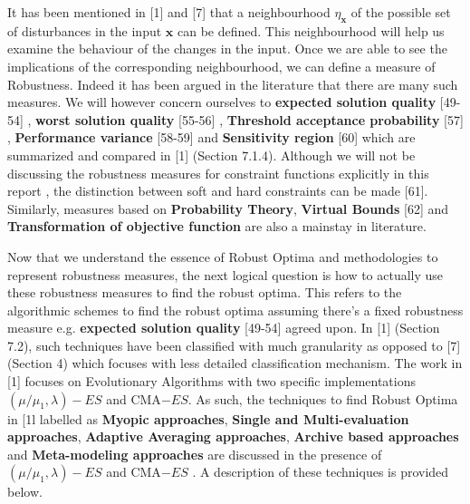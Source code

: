 It has been mentioned in [1] and [7] that a neighbourhood $ \eta_\textbf{x}$ of the possible set of disturbances in the input $\textbf{x}$ can be defined. This neighbourhood will help us examine the behaviour of the changes in the input. Once we are able to see the implications of the corresponding neighbourhood, we can define a measure of Robustness. Indeed it has been argued in the literature that there are many such measures. We will however concern ourselves to \textbf{expected solution quality} [49-54] , \textbf{worst solution quality} [55-56] , \textbf{Threshold acceptance probability } [57] , \textbf{Performance variance} [58-59] and \textbf{Sensitivity region} [60] which are summarized and compared in [1] (Section 7.1.4). Although we will not be discussing the robustness measures for constraint functions explicitly in this report , the distinction between soft and hard constraints can be made [61]. Similarly, measures based on \textbf{Probability Theory}, \textbf{Virtual Bounds} [62] and \textbf{Transformation of objective function} are also a mainstay in literature. 

Now that we understand the essence of Robust Optima and methodologies to represent robustness measures, the next logical question is how to actually use these robustness measures to find the robust optima. This refers to the algorithmic schemes to find the robust optima assuming there's a fixed robustness measure e.g. \textbf{expected solution quality} [49-54] agreed upon. In [1] (Section 7.2), such techniques have been classified with much granularity as opposed to [7] (Section 4) which focuses with less detailed classification mechanism. The work in [1] focuses on Evolutionary Algorithms with two specific implementations $ (\mu / \mu_{1},\lambda)-ES$ and CMA$-ES$. As such, the techniques to find Robust Optima in [1l labelled as \textbf{Myopic approaches}, \textbf{Single and Multi-evaluation approaches}, \textbf{Adaptive Averaging approaches}, \textbf{Archive based approaches} and \textbf{Meta-modeling approaches} are discussed in the presence of $ (\mu / \mu_{1},\lambda)-ES$ and CMA$-ES$ . A description of these techniques is provided below.

